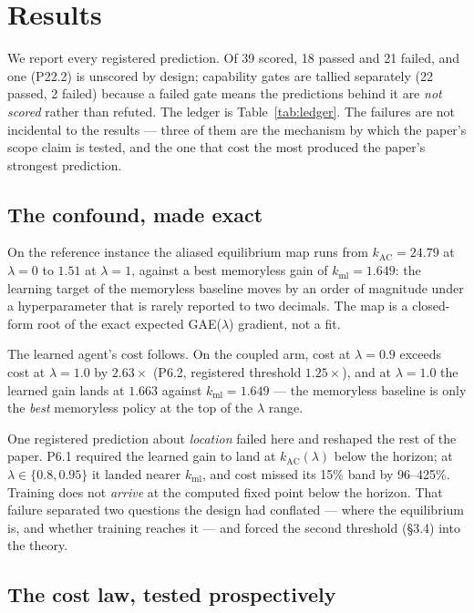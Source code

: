 \section{Results}
\label{sec:results}

We report every registered prediction. Of 39 scored, 18 passed and 21
failed, and one (P22.2) is unscored by design; capability gates are tallied
separately (22 passed, 2 failed)
because a failed gate means the predictions behind it are \emph{not
scored} rather than refuted. The ledger is Table~\ref{tab:ledger}. The failures are not
incidental to the results --- three of them are the mechanism by which
the paper's scope claim is tested, and the one that cost the most
produced the paper's strongest prediction.

\subsection{The confound, made
exact}

On the reference instance the aliased equilibrium map runs from
\(k_{\text{AC}} = 24.79\) at \(\lambda = 0\) to \(1.51\) at
\(\lambda = 1\), against a best memoryless gain of
\(k_{\text{ml}} = 1.649\): the learning target of the memoryless
baseline moves by an order of magnitude under a hyperparameter that is
rarely reported to two decimals. The map is a closed-form root of the
exact expected GAE(\(\lambda\)) gradient, not a fit.

The learned agent's cost follows. On the coupled arm, cost at
\(\lambda = 0.9\) exceeds cost at \(\lambda = 1.0\) by \(2.63\times\)
(P6.2, registered threshold \(1.25\times\)), and at \(\lambda = 1.0\)
the learned gain lands at \(1.663\) against \(k_{\text{ml}} = 1.649\)
--- the memoryless baseline is only the \emph{best} memoryless policy at
the top of the \(\lambda\) range.

One registered prediction about \emph{location} failed here and reshaped
the rest of the paper. P6.1 required the learned gain to land at
\(k_{\text{AC}}(\lambda)\) below the horizon; at
\(\lambda \in \{0.8, 0.95\}\) it landed nearer \(k_{\text{ml}}\), and
cost missed its 15\% band by 96--425\%. Training does not \emph{arrive}
at the computed fixed point below the horizon. That failure separated
two questions the design had conflated --- where the equilibrium is, and
whether training reaches it --- and forced the second threshold (\S3.4)
into the theory.

\subsection{The cost law, tested
prospectively}


